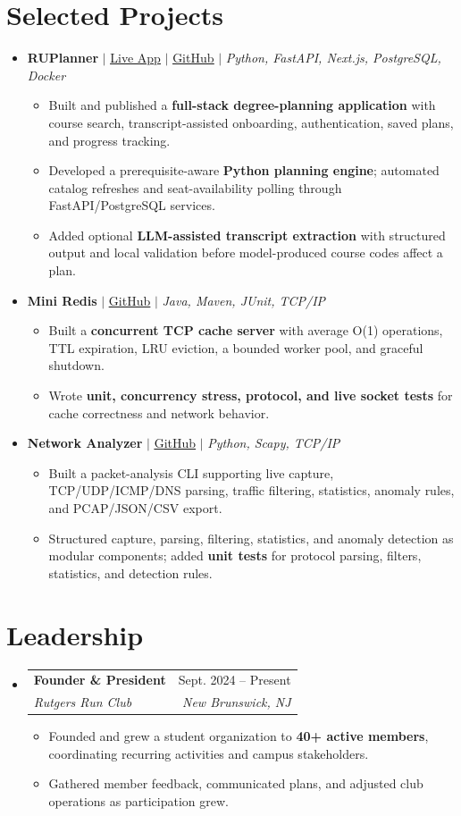 \documentclass[letterpaper,10pt]{article}
\makeatletter
\newcommand{\resumeItem}[1]{\item\small{#1}}
\newcommand{\resumeSubheading}[4]{
  \vspace{1pt}\item
  \begin{tabular*}{0.97\textwidth}[t]{l@{\extracolsep{\fill}}r}
    \textbf{#1} & #2 \\
    \textit{\small #3} & \textit{\small #4} \\
  \end{tabular*}\vspace{-3pt}
}
\newcommand{\resumeProjectHeading}[1]{\vspace{3pt}\item\small{#1}\vspace{0pt}}
\newcommand{\resumeSubHeadingListStart}{\begin{itemize}[leftmargin=0.15in,label={},itemsep=0pt,topsep=0pt]}
\newcommand{\resumeSubHeadingListEnd}{\end{itemize}}
\newcommand{\resumeItemListStart}{\begin{itemize}[leftmargin=0.15in,label=\textbullet,itemsep=-2pt,topsep=0pt]}
\newcommand{\resumeItemListEnd}{\end{itemize}\vspace{0pt}}
\makeatother
\begin{document}
\section{Selected Projects}
\resumeSubHeadingListStart
  \resumeProjectHeading{\textbf{RUPlanner} $|$ \href{https://ruplanner.app/}{\underline{Live App}} $|$ \href{https://github.com/ameer-rah/RUPlanner}{\underline{GitHub}} $|$ \emph{Python, FastAPI, Next.js, PostgreSQL, Docker}}
    \resumeItemListStart
      \resumeItem{Built and published a \textbf{full-stack degree-planning application} with course search, transcript-assisted onboarding, authentication, saved plans, and progress tracking.}
      \resumeItem{Developed a prerequisite-aware \textbf{Python planning engine}; automated catalog refreshes and seat-availability polling through FastAPI/PostgreSQL services.}
      \resumeItem{Added optional \textbf{LLM-assisted transcript extraction} with structured output and local validation before model-produced course codes affect a plan.}
    \resumeItemListEnd
  \resumeProjectHeading{\textbf{Mini Redis} $|$ \href{https://github.com/ameer-rah/mini-redis}{\underline{GitHub}} $|$ \emph{Java, Maven, JUnit, TCP/IP}}
    \resumeItemListStart
      \resumeItem{Built a \textbf{concurrent TCP cache server} with average O(1) operations, TTL expiration, LRU eviction, a bounded worker pool, and graceful shutdown.}
      \resumeItem{Wrote \textbf{unit, concurrency stress, protocol, and live socket tests} for cache correctness and network behavior.}
    \resumeItemListEnd
  \resumeProjectHeading{\textbf{Network Analyzer} $|$ \href{https://github.com/ameer-rah/Network-Analyzer}{\underline{GitHub}} $|$ \emph{Python, Scapy, TCP/IP}}
    \resumeItemListStart
      \resumeItem{Built a packet-analysis CLI supporting live capture, TCP/UDP/ICMP/DNS parsing, traffic filtering, statistics, anomaly rules, and PCAP/JSON/CSV export.}
      \resumeItem{Structured capture, parsing, filtering, statistics, and anomaly detection as modular components; added \textbf{unit tests} for protocol parsing, filters, statistics, and detection rules.}
    \resumeItemListEnd
\resumeSubHeadingListEnd

\section{Leadership}
\resumeSubHeadingListStart
  \resumeSubheading{Founder \& President}{Sept. 2024 -- Present}
    {Rutgers Run Club}{New Brunswick, NJ}
    \resumeItemListStart
      \resumeItem{Founded and grew a student organization to \textbf{40+ active members}, coordinating recurring activities and campus stakeholders.}
      \resumeItem{Gathered member feedback, communicated plans, and adjusted club operations as participation grew.}
    \resumeItemListEnd
\resumeSubHeadingListEnd
\end{document}

